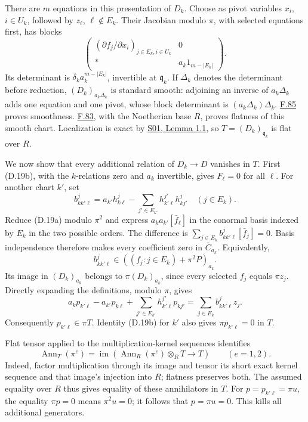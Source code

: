 \documentclass[11pt,a4paper,openany]{report}
\begin{document}
There are \(m\) equations in this presentation of \(D_k\). Choose as pivot variables \(x_i\), \(i\in U_k\), followed by \(z_\ell\), \(\ell\notin E_k\). Their Jacobian modulo \(\pi\), with selected equations first, has blocks \[
\begin{pmatrix}
(\partial f_j/\partial x_i)_{j\in E_k,i\in U_k}&0\\
*&a_k1_{m-|E_k|}
\end{pmatrix}.
\] Its determinant is \(\delta_k a_k^{m-|E_k|}\), invertible at \(\mathfrak q_k\). If \(\Delta_k\) denotes the determinant before reduction, \((D_k)_{a_k\Delta_k}\) is standard smooth: adjoining an inverse of \(a_k\Delta_k\) adds one equation and one pivot, whose block determinant is \((a_k\Delta_k)\Delta_k\). \hyperref[AG-RG-S05-algebra-lemma-standard-smooth]{F.85} proves smoothness. \hyperref[AG-RG-S05-algebra-lemma-smooth-syntomic]{F.83}, with the Noetherian base \(R\), proves flatness of this smooth chart. Localization is exact by \href{https://github.com/KokunoYumeto/open-math-courses/blob/main/docs/courses/AG-RG/AG-RG-S01.md}{S01, Lemma 1.1}, so \(T=(D_k)_{\mathfrak q_k}\) is flat over \(R\).

We now show that every additional relation of \(D_k\to D\) vanishes in \(T\). First (D.19b), with the \(k\)-relations zero and \(a_k\) invertible, gives \(F_\ell=0\) for all \(\ell\). For another chart \(k'\), set \[
b_{kk'\ell}^j=a_{k'}h_{k\ell}^j-
\sum_{j'\in E_{k'}}h_{k'\ell}^{j'}h_{kj'}^j
\quad(j\in E_k).
\] Reduce (D.19a) modulo \(\pi^2\) and express \(a_ka_{k'}[\bar f_\ell]\) in the conormal basis indexed by \(E_k\) in the two possible orders. The difference is \(\sum_{j\in E_k}b_{kk'\ell}^j[\bar f_j]=0\). Basis independence therefore makes every coefficient zero in \(\bar C_{a_k}\). Equivalently, \[
b_{kk'\ell}^j\in
((f_j:j\in E_k)+\pi^2P)_{a_k}.
\] Its image in \((D_k)_{a_k}\) belongs to \(\pi(D_k)_{a_k}\), since every selected \(f_j\) equals \(\pi z_j\). Directly expanding the definitions, modulo \(\pi\), gives \[
a_kp_{k'\ell}-a_{k'}p_{k\ell}
+\sum_{j'\in E_{k'}}h_{k'\ell}^{j'}p_{kj'}
=\sum_{j\in E_k}b_{kk'\ell}^jz_j.
\] Consequently \(p_{k'\ell}\in\pi T\). Identity (D.19b) for \(k'\) also gives \(\pi p_{k'\ell}=0\) in \(T\).

Flat tensor applied to the multiplication-kernel sequences identifies \[
\operatorname{Ann}_T(\pi^e)
=\operatorname{im}(\operatorname{Ann}_R(\pi^e)\otimes_RT\to T)
\qquad(e=1,2).
\] Indeed, factor multiplication through its image and tensor its short exact kernel sequence and that image's injection into \(R\); flatness preserves both. The assumed equality over \(R\) thus gives equality of these annihilators in \(T\). For \(p=p_{k'\ell}=\pi u\), the equality \(\pi p=0\) means \(\pi^2u=0\); it follows that \(p=\pi u=0\). This kills all additional generators.
\end{document}

